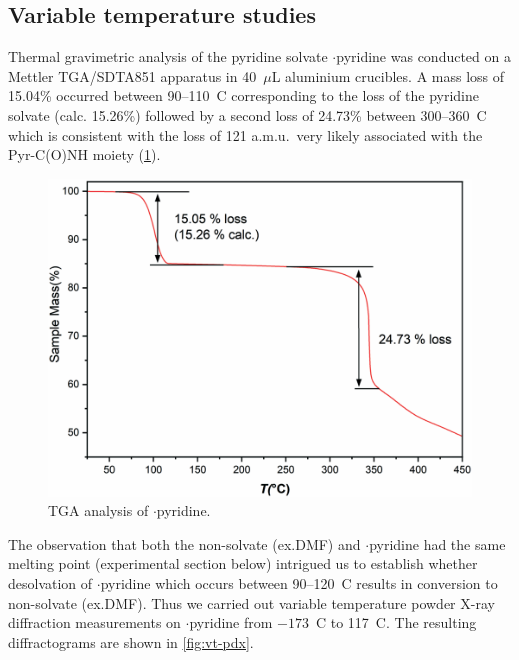 \begin{refsection}
    \subsection{Variable temperature studies}
    Thermal gravimetric analysis of the pyridine solvate $\cdot$pyridine was conducted on a Mettler TGA/SDTA851 apparatus in 40~$\mu$L aluminium crucibles.
    A mass loss of 15.04\% occurred between 90--110~\degree{}C corresponding to the loss of the pyridine solvate (calc. 15.26\%) followed by a second loss of 24.73\% between 300--360~\degree{}C which is consistent with the loss of 121 a.m.u.\ very likely associated with the Pyr-C(O)NH moiety (\cref{fig:tga}).
    
    \begin{figure}
        \centering
        \includegraphics[width=0.8\linewidth]{Figures/tga.pdf}
        \caption{TGA analysis of $\cdot$pyridine.}\label{fig:tga}
    \end{figure}
    
    The observation that both the non-solvate (ex.DMF) and $\cdot$pyridine had the same melting point (experimental section below) intrigued us to establish whether desolvation of $\cdot$pyridine which occurs between 90--120~\degree{}C results in conversion to non-solvate (ex.DMF).
    Thus we carried out variable temperature powder X-ray diffraction measurements on $\cdot$pyridine from $-173$~\degree{}C to 117~\degree{}C.
    The resulting diffractograms are shown in \cref{fig:vt-pdx}.
    

\end{refsection}
